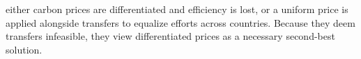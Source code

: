 \documentclass[12pt,english]{article}
\begin{document}
either carbon prices are differentiated and efficiency is lost, or a uniform price is applied alongside transfers to equalize efforts across countries. 
Because they deem transfers infeasible, 
they view differentiated prices as a necessary second-best solution. 


\end{document}

